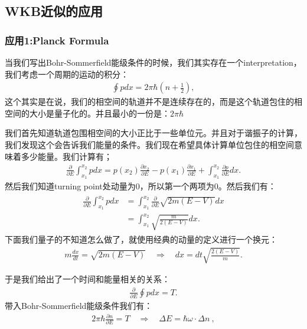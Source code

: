 \subsection{WKB近似的应用}

\subsubsection{应用1:Planck Formula}


当我们写出Bohr-Sommerfield能级条件的时候，我们其实存在一个interpretation，我们考虑一个周期的运动的积分：
\begin{align}
  \oint pdx=2\pi\hbar\left(n+\frac{1}{2}\right),
\end{align}
这个其实是在说，我们的相空间的轨道并不是连续存在的，而是这个轨道包住的相空间的大小是量子化的。并且最小的一份是：$ 2 \pi \hbar$

\bigskip
{}

我们首先知道轨道包围相空间的大小正比于一些单位元。并且对于谐振子的计算，我们发现这个会告诉我们能量的条件。我们现在希望具体计算单位包住的相空间意味着多少能量。我们计算有；
\begin{align}
  \frac{\partial}{\partial E}\int_{x_1}^{x_2}pdx=p(x_2)\frac{\partial
  x_2}{\partial E}-p(x_1)\frac{\partial x_1}{\partial
  E}+\int_{x_1}^{x_2}\frac{\partial p}{\partial E}dx.
\end{align}
然后我们知道turning point处动量为0，所以第一个两项为0。然后我们有：
\begin{align}
  \begin{aligned}\frac{\partial}{\partial
    E}\int_{x_1}^{x_2}pdx&=\int_{x_1}^{x_2}\frac{\partial}{\partial
    E}\sqrt{2m(E-V)}dx\\&=\int_{x_1}^{x_2}\sqrt{\frac{m}{2(E-V)}}dx.
  \end{aligned}
\end{align}
下面我们量子的不知道怎么做了，就使用经典的动量的定义进行一个换元：
\begin{align}
  m\frac{dx}{dt}=\sqrt{2m(E-V)}\quad\Rightarrow\quad
  dx=dt\sqrt{\frac{2(E-V)}{m}}.
\end{align}

于是我们给出了一个时间和能量相关的关系：
\begin{align}
  \frac{\partial}{\partial E}\oint pdx=T.
\end{align}
带入Bohr-Sommerfield能级条件我们有：
\begin{align}
  2\pi\hbar\frac{\partial n}{\partial E}=T\quad\Rightarrow\quad\Delta
  E=\hbar\omega\cdot\Delta n\mathrm{~,}
\end{align}

